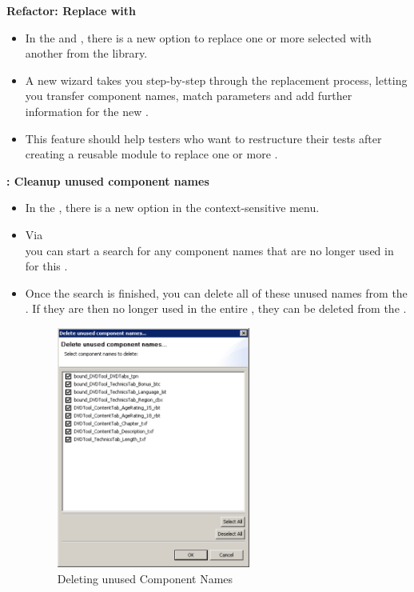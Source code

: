 \textbf{Refactor: Replace with \gdcase{}}
\begin{itemize}
\item In the \gdtestcaseeditor{} and \gdtestsuiteeditor{}, there is a new option to replace one or more selected \gdcases{} with another \gdcase{} from the library. 
\item A new wizard takes you step-by-step through the replacement process, letting you transfer component names, match parameters and add further information for the new \gdcase{}.
\item This feature should help testers who want to restructure their tests after creating a reusable module to replace one or more \gdcases{}. 
\end{itemize}

\textbf{\gdomeditor{}: Cleanup unused component names}

\begin{itemize}
\item In the \gdomeditor{}, there is a new option in the context-sensitive menu. 
\item Via  \\
you can start a search for any component names that are no longer used in \gdsuites{} for this \gdaut{}. 
\item Once the search is finished, you can delete all of these unused names from the \gdomeditor{}. If they are then no longer used in the entire \gdproject{}, 
they can be deleted from the \gdcompnamebrowser{}. 

\begin{figure}[h]
\begin{center}
\includegraphics[width=0.60\textwidth]{52/ps/DeleteUnusedCompNames}
\caption{Deleting unused Component Names}
\label{RNDeleteUnusedCN}
\end{center}
\end{figure}
		
\end{itemize}

